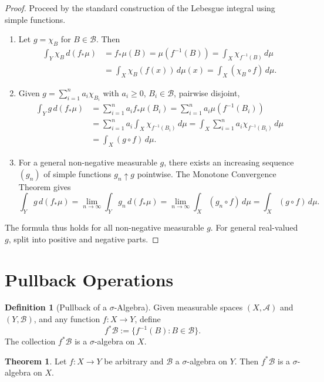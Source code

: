 \documentclass[12pt]{article}
\theoremstyle{definition}
\newtheorem{definition}{Definition}[section]
\newtheorem{theorem}{Theorem}[section]
\begin{document}
\begin{proof}
Proceed by the standard construction of the Lebesgue integral using simple functions.
\begin{enumerate}
    \item Let $g = \chi_B$ for $B \in \mathscr{B}$. Then
    \begin{align*}
        \int_Y \chi_B \, d(f_{*}\mu) &= f_{*}\mu(B) = \mu( f^{-1}(B) ) = \int_X \chi_{f^{-1}(B)} \, d\mu\\
        &= \int_X \chi_B(f(x)) \, d\mu(x) = \int_X (\chi_B \circ f) \, d\mu.
    \end{align*}
    \item Given $g = \sum_{i=1}^n a_i \chi_{B_i}$ with $a_i \geq 0$, $B_i \in \mathscr{B}$, pairwise disjoint,
    \begin{align*}
        \int_Y g \, d(f_{*}\mu) &= \sum_{i=1}^n a_i f_{*}\mu(B_i) = \sum_{i=1}^n a_i \mu(f^{-1}(B_i)) \\
        &= \sum_{i=1}^n a_i \int_X \chi_{f^{-1}(B_i)} \, d\mu = \int_X \sum_{i=1}^n a_i \chi_{f^{-1}(B_i)} \, d\mu \\
        &= \int_X (g \circ f) \, d\mu.
    \end{align*}
    \item For a general non-negative measurable $g$, there exists an increasing sequence $(g_n)$ of simple functions $g_n \uparrow g$ pointwise. The Monotone Convergence Theorem gives
    \[
    \int_Y g \, d(f_{*}\mu) = \lim_{n \to \infty} \int_Y g_n \, d(f_{*}\mu) = \lim_{n \to \infty} \int_X (g_n \circ f) \, d\mu = \int_X (g \circ f) \, d\mu.
    \]
\end{enumerate}
The formula thus holds for all non-negative measurable $g$. For general real-valued $g$, split into positive and negative parts.
\end{proof}

\section{Pullback Operations}

\begin{definition}[Pullback of a $\sigma$-Algebra]
Given measurable spaces $(X, \mathscr{A})$ and $(Y, \mathscr{B})$, and any function $f: X \to Y$, define
\[
f^{*}\mathscr{B} := \{ f^{-1}(B) : B \in \mathscr{B} \}.
\]
The collection $f^*\mathscr{B}$ is a $\sigma$-algebra on $X$.
\end{definition}

\begin{theorem}
Let $f: X \to Y$ be arbitrary and $\mathscr{B}$ a $\sigma$-algebra on $Y$. Then $f^*\mathscr{B}$ is a $\sigma$-algebra on $X$.
\end{theorem}
\end{document}
